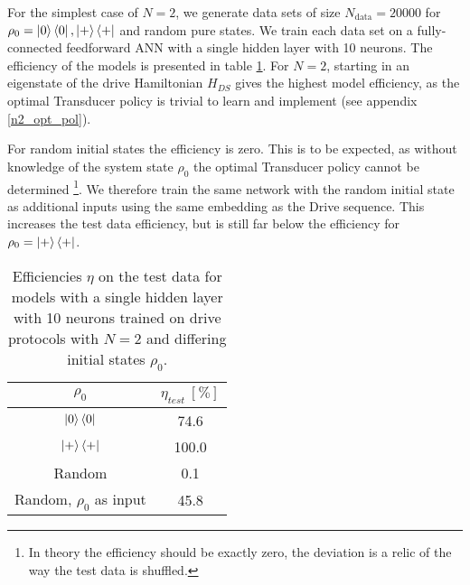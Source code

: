 For the simplest case of $N = 2$, we generate data sets of size $N_{\mathrm{data}} = 20000$ for $\rho_0 = \ket{0} \bra{0}, \ket{+} \bra{+}$ and random pure states.
We train each data set on a fully-connected feedforward ANN with a single hidden layer with 10 neurons.
The efficiency of the models is presented in table \ref{n2efftable}.
For $N = 2$, starting in an eigenstate of the drive Hamiltonian $H_{DS}$ gives the highest model efficiency, as the optimal Transducer policy is trivial to learn and implement (see appendix \ref{n2_opt_pol}).

For random initial states the efficiency is zero.
This is to be expected, as without knowledge of the system state $\rho_0$ the optimal Transducer policy cannot be determined \footnote{In theory the efficiency should be exactly zero, the deviation is a relic of the way the test data is shuffled.}.
We therefore train the same network with the random initial state as additional inputs using the same embedding as the Drive sequence.
This increases the test data efficiency, but is still far below the efficiency for $\rho_0 = \ket{+} \bra{+}$.


\begin{table}[h]
	\centering
	\begin{tabular}{ c | c }
		$\rho_0$ & $\eta_{test} \ [\%]$ \\
		\hline
		$\ket{0} \bra{0}$ & 74.6 \\
		$\ket{+} \bra{+}$ & 100.0 \\
		Random & 0.1 \\
		Random, $\rho_0$ as input & 45.8 \\
	\end{tabular}
	\caption{Efficiencies $\eta$ on the test data for models with a single hidden layer with 10 neurons trained on drive protocols with $N = 2$ and differing initial states $\rho_0$.}
	\label{n2efftable}
\end{table}